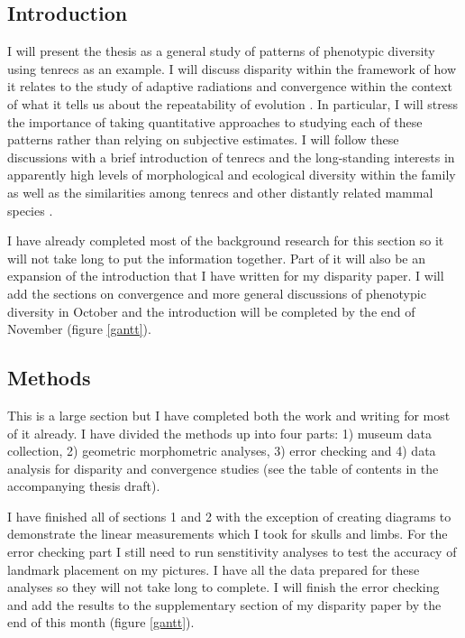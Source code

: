 \documentclass[12pt,a4paper]{article}
\begin{document}
\subsection{Introduction}

	I will present the thesis as a general study of patterns of phenotypic diversity using tenrecs as an example.
	I will discuss disparity within the framework of how it relates to the study of adaptive radiations \citep{Losos2010a} and convergence within the context of what it tells us about the repeatability of evolution \citep[e.g][]{Blount2008}. In particular, I will stress the importance of taking quantitative approaches to studying each of these patterns rather than relying on subjective estimates. I will follow these discussions with a brief introduction of tenrecs and the long-standing interests in apparently high levels of morphological and ecological diversity within the family as well as the similarities among tenrecs and other distantly related mammal species \citep[e.g.][]{Eisenberg1969, Soarimalala2011, Olson2013}. 

	I have already completed most of the background research for this section so it will not take long to put the information together. Part of it will also be an expansion of the introduction that I have written for my disparity paper. I will add the sections on convergence and more general discussions of phenotypic diversity in October and the introduction will be completed by the end of November (figure \ref*{gantt}).

\subsection{Methods}

	This is a large section but I have completed both the work and writing for most of it already.
	I have divided the methods up into four parts: 1) museum data collection, 2) geometric morphometric analyses, 3) error checking and 4) data analysis for disparity and convergence studies (see the table of contents in the accompanying thesis draft).

	I have finished all of sections 1 and 2 with the exception of creating diagrams to demonstrate the linear measurements which I took for skulls and limbs. For the error checking part I still need to run senstitivity analyses to test the accuracy of landmark placement on my pictures. I have all the data prepared for these analyses so they will not take long to complete. I will finish the error checking and add the results to the supplementary section of my disparity paper by the end of this month (figure \ref{gantt}).
	
\end{document}
